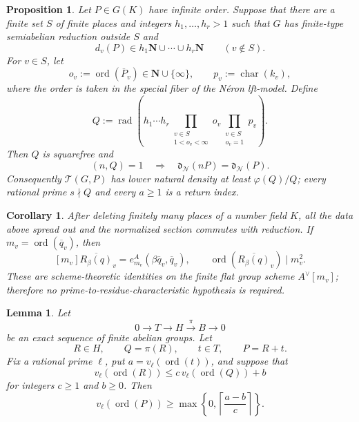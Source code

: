 \documentclass[10pt,a4paper]{amsart}
\newtheorem{proposition}{Proposition}
\newtheorem{corollary}{Corollary}
\newtheorem{lemma}{Lemma}
\newcommand{\N}{\mathbf N}
\newcommand{\Ner}{\mathcal N}
\newcommand{\dd}{\mathfrak d}
\newcommand{\ord}{\operatorname{ord}}
\newcommand{\rad}{\operatorname{rad}}
\begin{document}
\begin{proposition}
\label{prop:finite-cone-return}
Let $P\in G(K)$ have infinite order.  Suppose that there are a finite set $S$
of finite places and integers $h_1,\ldots,h_r>1$ such that $G$ has finite-type
semiabelian reduction outside $S$ and
\[
 d_v(P)\in h_1\N\cup\cdots\cup h_r\N
 \qquad(v\notin S).
\]
For $v\in S$, let
\[
 o_v:=\ord(\overline P_v)\in\N\cup\{\infty\},
 \qquad p_v:=\operatorname{char}(k_v),
\]
where the order is taken in the special fiber of the N\'eron lft-model.  Define
\[
 Q:=\rad\!\left(
 h_1\cdots h_r
 \prod_{\substack{v\in S\\1<o_v<\infty}}o_v
 \prod_{\substack{v\in S\\o_v=1}}p_v
 \right).
\]
Then $Q$ is squarefree and
\begin{equation}\label{eq:finite-cone-core}
 (n,Q)=1
 \quad\Longrightarrow\quad
 \dd_{\Ner}(nP)=\dd_{\Ner}(P).
\end{equation}
Consequently $\mathscr T(G,P)$ has lower natural density at least
$\varphi(Q)/Q$; every rational prime $s\nmid Q$ and every $a\ge1$ is a return
index.
\end{proposition}

\begin{corollary}\label{cor:ribet-reduction}
After deleting finitely many places of a number field $K$, all the data above
spread out and the normalized section commutes with reduction.  If
$m_v=\ord(\overline q_v)$, then
\[
 [m_v]\overline{R_\beta(q)}_v
 =e_{m_v}^A(\beta\overline q_v,\overline q_v),
 \qquad
 \ord(\overline{R_\beta(q)}_v)\mid m_v^2.
\]
These are scheme-theoretic identities on the finite flat group scheme
$A^\vee[m_v]$; therefore no prime-to-residue-characteristic hypothesis is
required.
\end{corollary}

\begin{lemma}\label{lem:amplification}
Let
\[
 0\longrightarrow T\longrightarrow H\xrightarrow{\pi}B\longrightarrow0
\]
be an exact sequence of finite abelian groups.  Let
\[
 R\in H,\qquad Q=\pi(R),\qquad t\in T,\qquad P=R+t.
\]
Fix a rational prime $\ell$, put $a=v_\ell(\ord(t))$, and suppose that
\begin{equation}\label{eq:order-control}
 v_\ell(\ord(R))
 \le c\,v_\ell(\ord(Q))+b
\end{equation}
for integers $c\ge1$ and $b\ge0$.  Then
\begin{equation}\label{eq:amplification-conclusion}
 v_\ell(\ord(P))
 \ge
 \max\left\{0,\left\lceil\frac{a-b}{c}\right\rceil\right\}.
\end{equation}
\end{lemma}
\end{document}
